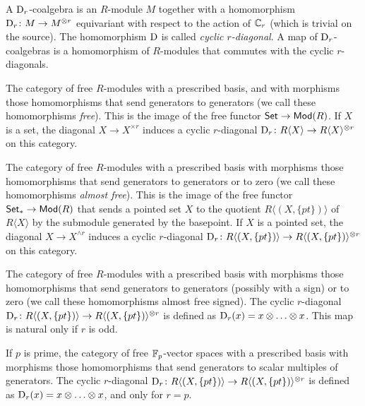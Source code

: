 \begin{definition}
	A $\mathrm{D}_r$-coalgebra is an $R$-module $M$ together with a homomorphism $\mathrm{D}_r\colon M\to M^{\otimes r}$ equivariant with respect to the action of $\mathbb{C}_r$ (which is trivial on the source). The homomorphism $\mathrm{D}$ is called \emph{cyclic $r$-diagonal}. A map of $\mathrm{D}_r$-coalgebras is a homomorphism of $R$-modules that commutes with the cyclic $r$-diagonals.  
\end{definition}
\begin{example}
	The category of free $R$-modules with a prescribed basis, and with morphisms those homomorphisms that send generators to generators (we call these homomorphisms \emph{free}). This is the image of the free functor $\mathsf{Set}\to \mathsf{Mod}(R)$. If $X$ is a set, the diagonal $X\to X^{\times r}$ induces a cyclic $r$-diagonal $\mathrm{D}_r\colon R\langle X\rangle \to R\langle X\rangle^{\otimes r}$ on this category.
\end{example}
\begin{example}
		The category of free $R$-modules with a prescribed basis with morphisms those homomorphisms that send generators to generators or to zero (we call these homomorphisms \emph{almost free}). This is the image of the free functor $\mathsf{Set}_*\to \mathsf{Mod}(R)$ that sends a pointed set $X$ to the quotient $R\langle (X,\{pt\})\rangle$ of $R\langle X\rangle$ by the submodule generated by the basepoint. If $X$ is a pointed set, the diagonal $X\to X^{\wedge r}$ induces a cyclic $r$-diagonal $\mathrm{D}_r\colon R\langle (X,\{pt\})\rangle \to R\langle (X,\{pt\})\rangle^{\otimes r}$ on this category.
\end{example}

\begin{example}
	The category of free $R$-modules with a prescribed basis with morphisms those homomorphisms that send generators to generators (possibly with a sign) or to zero (we call these homomorphisms almost free signed). The cyclic $r$-diagonal $\mathrm{D}_r\colon R\langle (X,\{pt\})\rangle \to R\langle (X,\{pt\})\rangle^{\otimes r}$ is defined as $\mathrm{D}_r(x) = x\otimes\ldots \otimes x$. This map is natural only if $r$ is odd.
\end{example}

\begin{example}
	If $p$ is prime, the category of free $\mathbb{F}_p$-vector spaces with a prescribed basis with morphisms those homomorphisms that send generators to scalar multiples of generators. The cyclic $r$-diagonal $\mathrm{D}_r\colon R\langle (X,\{pt\})\rangle \to R\langle (X,\{pt\})\rangle^{\otimes r}$ is defined as $\mathrm{D}_r(x) = x\otimes\ldots \otimes x$, and only for $r=p$.
\end{example}

